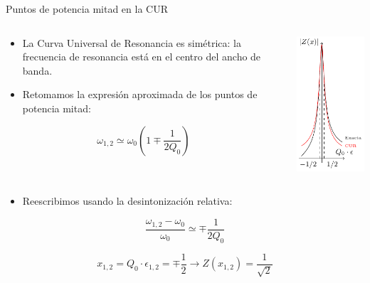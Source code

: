 \documentclass[aspectratio=169, usenames,svgnames,dvipsnames]{beamer}
\begin{document}
\begin{frame}[label={sec:orge4aeabd}]{Puntos de potencia mitad en la CUR}
\begin{columns}
\begin{column}{0.7\columnwidth}
\begin{itemize}
\item La Curva Universal de Resonancia es simétrica: la frecuencia de resonancia está en el centro del ancho de banda.
\item Retomamos la expresión aproximada de los puntos de potencia mitad:
\end{itemize}
\[
  \omega_{1,2} \simeq \omega_0 (1 \mp \frac{1}{2Q_0})
\]
\end{column}

\begin{column}{0.3\columnwidth}
\begin{center}
\includegraphics[height=0.8\textheight]{../figs/CUR.pdf}
\end{center}
\end{column}
\end{columns}

\begin{itemize}
\item Reescribimos usando la desintonización relativa:
\end{itemize}
\[
  \frac{\omega_{1,2} - \omega_0}{\omega_0} \simeq \mp \frac{1}{2Q_0}
\]

\[
  \boxed{x_{1,2} = Q_0 \cdot \epsilon_{1,2} = \mp \frac{1}{2}} \rightarrow Z(x_{1,2}) = \frac{1}{\sqrt{2}}
\]
\end{frame}
\end{document}
